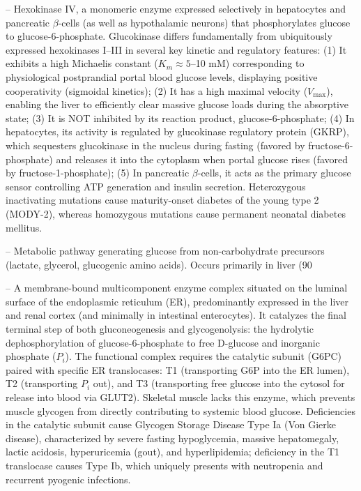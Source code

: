 -- Hexokinase IV, a monomeric enzyme expressed selectively in hepatocytes and pancreatic $\beta$-cells (as well as hypothalamic neurons) that phosphorylates glucose to glucose-6-phosphate. Glucokinase differs fundamentally from ubiquitously expressed hexokinases I--III in several key kinetic and regulatory features: (1) It exhibits a high Michaelis constant ($K_m \approx 5$--10 mM) corresponding to physiological postprandial portal blood glucose levels, displaying positive cooperativity (sigmoidal kinetics); (2) It has a high maximal velocity ($V_{\max}$), enabling the liver to efficiently clear massive glucose loads during the absorptive state; (3) It is NOT inhibited by its reaction product, glucose-6-phosphate; (4) In hepatocytes, its activity is regulated by glucokinase regulatory protein (GKRP), which sequesters glucokinase in the nucleus during fasting (favored by fructose-6-phosphate) and releases it into the cytoplasm when portal glucose rises (favored by fructose-1-phosphate); (5) In pancreatic $\beta$-cells, it acts as the primary glucose sensor controlling ATP generation and insulin secretion. Heterozygous inactivating mutations cause maturity-onset diabetes of the young type 2 (MODY-2), whereas homozygous mutations cause permanent neonatal diabetes mellitus.

-- Metabolic pathway generating glucose from non-carbohydrate precursors (lactate, glycerol, glucogenic amino acids). Occurs primarily in liver (90%

-- A membrane-bound multicomponent enzyme complex situated on the luminal surface of the endoplasmic reticulum (ER), predominantly expressed in the liver and renal cortex (and minimally in intestinal enterocytes). It catalyzes the final terminal step of both gluconeogenesis and glycogenolysis: the hydrolytic dephosphorylation of glucose-6-phosphate to free D-glucose and inorganic phosphate ($P_i$). The functional complex requires the catalytic subunit (G6PC) paired with specific ER translocases: T1 (transporting G6P into the ER lumen), T2 (transporting $P_i$ out), and T3 (transporting free glucose into the cytosol for release into blood via GLUT2). Skeletal muscle lacks this enzyme, which prevents muscle glycogen from directly contributing to systemic blood glucose. Deficiencies in the catalytic subunit cause Glycogen Storage Disease Type Ia (Von Gierke disease), characterized by severe fasting hypoglycemia, massive hepatomegaly, lactic acidosis, hyperuricemia (gout), and hyperlipidemia; deficiency in the T1 translocase causes Type Ib, which uniquely presents with neutropenia and recurrent pyogenic infections.

